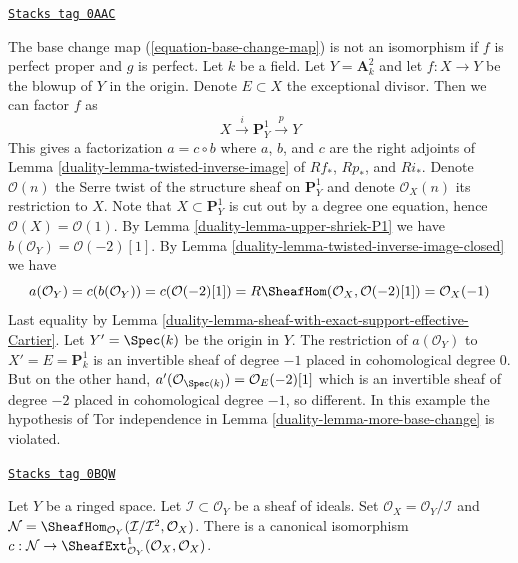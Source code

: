 \begin{example}
\label{duality-example-base-change-wrong}
\href{https://stacks.math.columbia.edu/tag/0AAC}{\texttt{Stacks tag 0AAC}}

The base change map (\ref{equation-base-change-map}) is not an
isomorphism if $f$ is perfect proper and $g$ is perfect.
Let $k$ be a field. Let $Y = \mathbf{A}^2_k$ and let $f : X \to Y$
be the blowup of $Y$ in the origin. Denote $E \subset X$ the
exceptional divisor. Then we can factor $f$ as
$$
X \xrightarrow{i} \mathbf{P}^1_Y \xrightarrow{p} Y
$$
This gives a factorization $a = c \circ b$ where
$a$, $b$, and $c$ are the right adjoints of
Lemma \ref{duality-lemma-twisted-inverse-image}
of $Rf_*$, $Rp_*$, and $Ri_*$. Denote $\mathcal{O}(n)$ the
Serre twist of the structure sheaf on $\mathbf{P}^1_Y$ and
denote $\mathcal{O}_X(n)$ its restriction to $X$.
Note that $X \subset \mathbf{P}^1_Y$ is cut out by
a degree one equation, hence $\mathcal{O}(X) = \mathcal{O}(1)$.
By Lemma \ref{duality-lemma-upper-shriek-P1} we have
$b(\mathcal{O}_Y) = \mathcal{O}(-2)[1]$.
By Lemma \ref{duality-lemma-twisted-inverse-image-closed}
we have
$$
a(\mathcal{O}_Y) = c(b(\mathcal{O}_Y)) =
c(\mathcal{O}(-2)[1]) =
R\SheafHom(\mathcal{O}_X, \mathcal{O}(-2)[1]) =
\mathcal{O}_X(-1)
$$
Last equality by Lemma \ref{duality-lemma-sheaf-with-exact-support-effective-Cartier}.
Let $Y' = \Spec(k)$ be the origin in $Y$. The restriction of
$a(\mathcal{O}_Y)$ to $X' = E = \mathbf{P}^1_k$
is an invertible sheaf of degree $-1$ placed in cohomological
degree $0$. But on the other hand,
$a'(\mathcal{O}_{\Spec(k)}) = \mathcal{O}_E(-2)[1]$
which is an invertible sheaf of degree $-2$ placed in
cohomological degree $-1$, so different. In this example
the hypothesis of Tor independence in Lemma \ref{duality-lemma-more-base-change}
is violated.
\end{example}

\begin{lemma}[Ext]
\label{duality-lemma-ext}
\href{https://stacks.math.columbia.edu/tag/0BQW}{\texttt{Stacks tag 0BQW}}

Let $Y$ be a ringed space. Let $\mathcal{I} \subset \mathcal{O}_Y$
be a sheaf of ideals. Set $\mathcal{O}_X = \mathcal{O}_Y/\mathcal{I}$ and
$\mathcal{N} =
\SheafHom_{\mathcal{O}_Y}(\mathcal{I}/\mathcal{I}^2, \mathcal{O}_X)$.
There is a canonical isomorphism
$c : \mathcal{N} \to
\SheafExt^1_{\mathcal{O}_Y}(\mathcal{O}_X, \mathcal{O}_X)
$.
\end{lemma}


